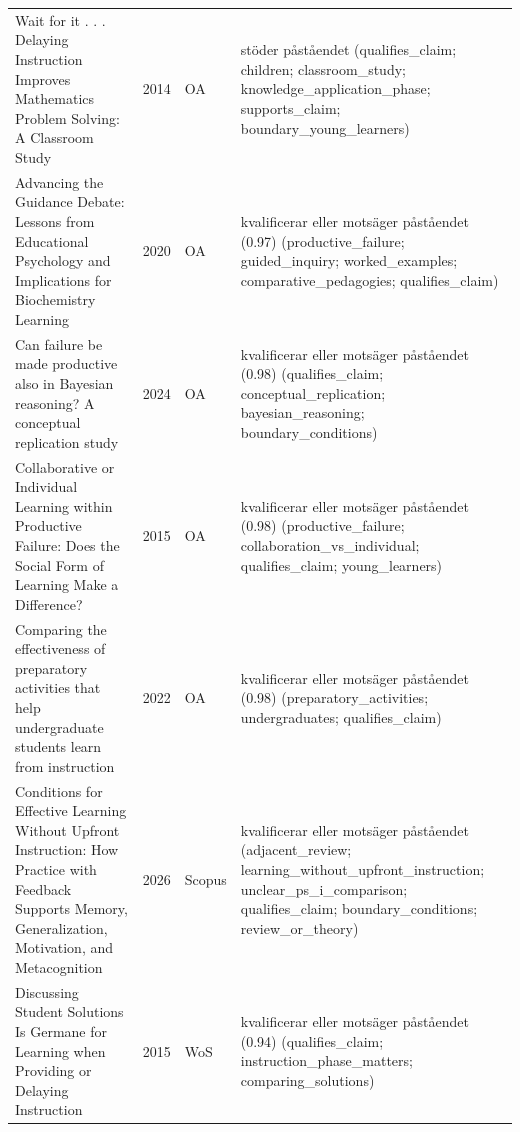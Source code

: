 \begin{longtable}{@{}%
  >{\raggedright\arraybackslash}p{}c%
  >{\raggedright\arraybackslash}p{}%
  >{\raggedright\arraybackslash\footnotesize}p{}@{}}
Wait for it . . . Delaying Instruction Improves Mathematics Problem Solving: A Classroom Study & 2014 & OA & stöder påståendet (qualifies\_\allowbreak{}claim; children; classroom\_\allowbreak{}study; knowledge\_\allowbreak{}application\_\allowbreak{}phase; supports\_\allowbreak{}claim; boundary\_\allowbreak{}young\_\allowbreak{}learners) \\
Advancing the Guidance Debate: Lessons from Educational Psychology and Implications for Biochemistry Learning & 2020 & OA & kvalificerar eller motsäger påståendet (0.97) (productive\_\allowbreak{}failure; guided\_\allowbreak{}inquiry; worked\_\allowbreak{}examples; comparative\_\allowbreak{}pedagogies; qualifies\_\allowbreak{}claim) \\
Can failure be made productive also in Bayesian reasoning? A conceptual replication study & 2024 & OA & kvalificerar eller motsäger påståendet (0.98) (qualifies\_\allowbreak{}claim; conceptual\_\allowbreak{}replication; bayesian\_\allowbreak{}reasoning; boundary\_\allowbreak{}conditions) \\
Collaborative or Individual Learning within Productive Failure: Does the Social Form of Learning Make a Difference? & 2015 & OA & kvalificerar eller motsäger påståendet (0.98) (productive\_\allowbreak{}failure; collaboration\_\allowbreak{}vs\_\allowbreak{}individual; qualifies\_\allowbreak{}claim; young\_\allowbreak{}learners) \\
Comparing the effectiveness of preparatory activities that help undergraduate students learn from instruction & 2022 & OA & kvalificerar eller motsäger påståendet (0.98) (preparatory\_\allowbreak{}activities; undergraduates; qualifies\_\allowbreak{}claim) \\
Conditions for Effective Learning Without Upfront Instruction: How Practice with Feedback Supports Memory, Generalization, Motivation, and Metacognition & 2026 & Scopus & kvalificerar eller motsäger påståendet (adjacent\_\allowbreak{}review; learning\_\allowbreak{}without\_\allowbreak{}upfront\_\allowbreak{}instruction; unclear\_\allowbreak{}ps\_\allowbreak{}i\_\allowbreak{}comparison; qualifies\_\allowbreak{}claim; boundary\_\allowbreak{}conditions; review\_\allowbreak{}or\_\allowbreak{}theory) \\
Discussing Student Solutions Is Germane for Learning when Providing or Delaying Instruction & 2015 & WoS & kvalificerar eller motsäger påståendet (0.94) (qualifies\_\allowbreak{}claim; instruction\_\allowbreak{}phase\_\allowbreak{}matters; comparing\_\allowbreak{}solutions) \\

\end{longtable}
